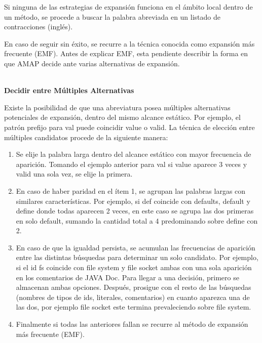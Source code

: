 Si ninguna de las estrategias de expansión funciona en el ámbito local dentro de un método, se procede a buscar la palabra abreviada en un listado de contracciones (inglés).

En caso de seguir sin éxito, se recurre a la técnica conocida como expansión más frecuente (EMF).
Antes de explicar EMF, esta pendiente describir la forma en que AMAP decide ante varias alternativas de expansión.

\noindent \textbf{\\Decidir entre Múltiples Alternativas\\}

Existe la posibilidad de que una abreviatura posea múltiples alternativas potenciales de expansión, dentro del mismo alcance estático. Por ejemplo, el patrón prefijo para \textsf{val} puede coincidir \textsf{value} o \textsf{valid}. La técnica de elección entre múltiples candidatos procede de la siguiente manera:

\begin{enumerate}
\itemsep0em%
\item Se elije la palabra larga dentro del alcance estático con mayor frecuencia de aparición. Tomando el ejemplo anterior para \textsf{val} si \textsf{value} aparece 3 veces y \textsf{valid} una sola vez, se elije la primera.

\item En caso de haber paridad en el ítem 1, se agrupan las palabras largas con similares características. Por ejemplo, si \textsf{def} coincide con \textsf{defaults}, \textsf{default} y \textsf{define} donde todas aparecen 2 veces, en este caso se agrupa las dos primeras en solo \textsf{default}, sumando la cantidad total a 4 predominando sobre \textsf{define} con 2.

\item En caso de que la igualdad persista, se acumulan las frecuencias de aparición entre las distintas búsquedas para determinar un solo candidato. Por ejemplo, si el id \textsf{fs} coincide con \textsf{file system} y \textsf{file socket} ambas con una sola aparición en los comentarios de JAVA Doc. Para llegar a una decisión, primero se almacenan ambas opciones. Después, prosigue con el resto de las búsquedas (nombres de tipos de ids, literales, comentarios) en cuanto aparezca una de las dos, por ejemplo \textsf{file socket} este termina prevaleciendo sobre \textsf{file system}.

\item Finalmente si todas las anteriores fallan se recurre al método de expansión más frecuente (EMF). 

\end{enumerate}


